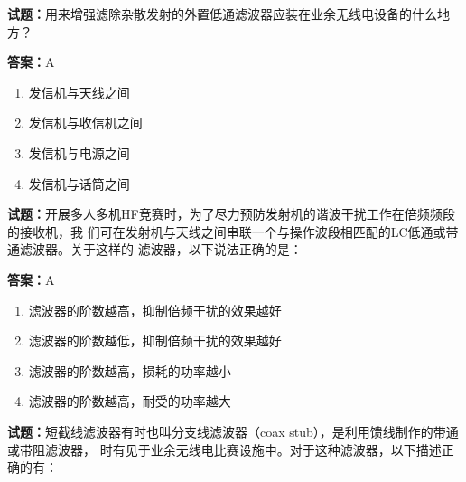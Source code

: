 \documentclass{ctexbook}
\begin{document}




\vspace{1em}

\textbf{试题：}用来增强滤除杂散发射的外置低通滤波器应装在业余无线电设备的什么地方？ 

\textbf{答案：}A 

\begin{enumerate}[leftmargin=3em]
  \item 发信机与天线之间 

  \item 发信机与收信机之间 

  \item 发信机与电源之间 

  \item 发信机与话筒之间 

\end{enumerate}






\vspace{1em}

\textbf{试题：}开展多人多机HF竞赛时，为了尽力预防发射机的谐波干扰工作在倍频频段的接收机，我
们可在发射机与天线之间串联一个与操作波段相匹配的LC低通或带通滤波器。关于这样的
滤波器，以下说法正确的是： 

\textbf{答案：}A 

\begin{enumerate}[leftmargin=3em]
  \item 滤波器的阶数越高，抑制倍频干扰的效果越好 

  \item 滤波器的阶数越低，抑制倍频干扰的效果越好 

  \item 滤波器的阶数越高，损耗的功率越小 

  \item 滤波器的阶数越高，耐受的功率越大 

\end{enumerate}





\vspace{1em}

\textbf{试题：}短截线滤波器有时也叫分支线滤波器（coax stub），是利用馈线制作的带通或带阻滤波器，
时有见于业余无线电比赛设施中。对于这种滤波器，以下描述正确的有： 
\end{document}
